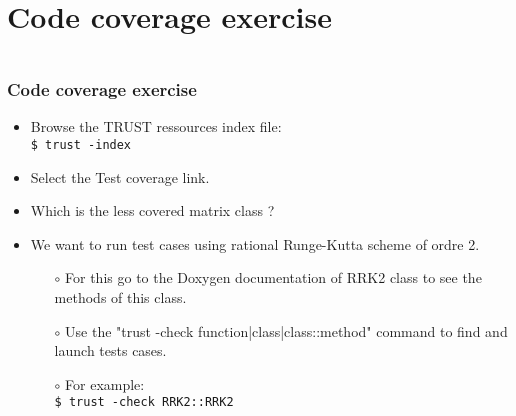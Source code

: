 \documentclass[10pt, hyperref={unicode=true,pdfusetitle, bookmarks=true,bookmarksnumbered=false,bookmarksopen=false, breaklinks=false,pdfborder={0 0 1},backref=true,colorlinks=true,linkcolor=darkblue,pageanchor, urlcolor=darkblue}]{beamer}
\begin{document}
\section{{\bf{Code coverage exercise}}}
\begin{frame}
\begin{columns}[c] 
\tableofcontents[sections={1-4},currentsection, currentsubsection]
\tableofcontents[sections={5-8},currentsection, currentsubsection]
\end{columns}
\end{frame}
\begin{frame}
\frametitle{Code coverage exercise}
\begin{block}{}

\begin{itemize}
\item Browse the TRUST ressources index file:\\
\texttt{\$ trust -index}

\item Select the Test coverage link.

\item Which is the less covered matrix class ?

\item We want to run test cases using rational Runge-Kutta scheme of ordre 2.

\begin{itemize}
    \item [$\circ$] For this go to the Doxygen documentation of RRK2 class to see the methods of this class.
    \item [$\circ$] Use the "trust -check function|class|class::method" command to find and launch tests cases.
    \item [$\circ$] For example: \\
    \texttt{\$ trust -check RRK2::RRK2}
\end{itemize}
\end{itemize}

\end{block}
\end{frame}
\end{document}
